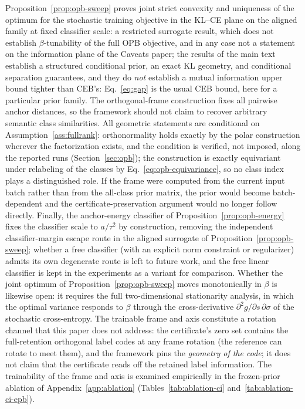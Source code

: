 \begin{remark}
\label{rem:opb-scope}
Proposition~\ref{prop:opb-sweep} proves joint strict convexity and uniqueness of the
optimum for the stochastic training objective in the KL--CE plane on the aligned family
at fixed classifier scale: a restricted surrogate result, which does not establish
$\beta$-tunability of the full OPB objective, and in any case not a statement on the
information plane of the Caveats paper; the results of the main text
establish a structured conditional prior, an exact KL geometry, and conditional
separation guarantees, and they do \emph{not} establish a mutual information upper
bound tighter than CEB's: Eq.~\eqref{eq:gap} is the usual CEB bound, here
for a particular prior family. The orthogonal-frame construction fixes all pairwise anchor
distances, so the framework should not claim to recover arbitrary semantic class
similarities. All geometric statements are conditional on
Assumption~\ref{ass:fullrank}: orthonormality holds exactly by the polar construction
wherever the factorization exists, and the condition is verified, not imposed,
along the reported runs (Section~\ref{sec:opb}); the construction is exactly
equivariant under relabeling of the classes by Eq.~\eqref{eq:opb-equivariance}, so
no class index plays a distinguished role. If the frame were computed from the
current input batch rather than from the all-class prior matrix, the prior would
become batch-dependent and the certificate-preservation argument would no longer
follow directly. Finally, the
anchor-energy classifier of Proposition~\ref{prop:opb-energy} fixes the classifier
scale to $a/\tau^2$ by construction, removing the independent classifier-margin
escape route in the aligned surrogate of Proposition~\ref{prop:opb-sweep}; whether a
free classifier (with an explicit norm constraint or regularizer) admits its own
degenerate route is left to future work, and the free linear classifier is kept in
the experiments as a variant for comparison.
Whether the joint optimum of Proposition~\ref{prop:opb-sweep} moves monotonically in
$\beta$ is likewise open: it requires the full two-dimensional stationarity analysis,
in which the optimal variance responds to $\beta$ through the cross-derivative
$\partial^2 g/\partial s\,\partial\sigma$ of the stochastic cross-entropy.
The trainable frame and axis constitute a rotation channel that this paper does not
address: the certificate's zero set contains the full-retention orthogonal label codes
at any frame rotation (the reference can rotate to meet them), and the framework pins
the \emph{geometry of the code}; it does not claim that the certificate reads off
the retained label information. The trainability of the frame and axis is examined
empirically in the frozen-prior ablation of Appendix~\ref{app:ablation}
(Tables~\ref{tab:ablation-ci} and~\ref{tab:ablation-ci-epb}).
\end{remark}
